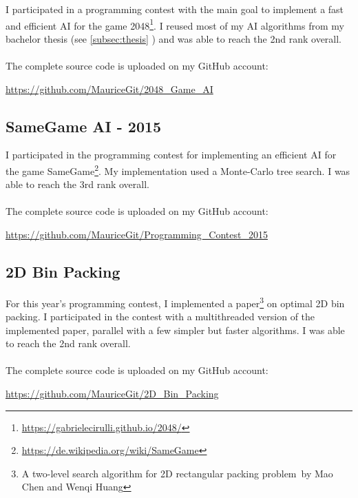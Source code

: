 \documentclass[a4paper, 12pt]{article}
\begin{document}
I participated in a programming contest with the main goal to implement a fast and efficient AI for the game
2048\footnote{\url{https://gabrielecirulli.github.io/2048/}}. I reused most of my AI algorithms from my bachelor 
thesis (see \ref{subsec:thesis} \glqq{}\grqq) and was able to reach the 2nd rank overall.
\\
\\
The complete source code is uploaded on my GitHub account:

\begin{center}
	\url{https://github.com/MauriceGit/2048_Game_AI}
\end{center}

\subsection{SameGame AI - 2015}

I participated in the programming contest for implementing an efficient AI for the game
SameGame\footnote{\url{https://de.wikipedia.org/wiki/SameGame}}. My implementation used a Monte-Carlo tree 
search. I was able to reach the 3rd rank overall.
\\
\\
The complete source code is uploaded on my GitHub account:

\begin{center}
	\url{https://github.com/MauriceGit/Programming_Contest_2015}
\end{center}


\subsection{2D Bin Packing}

For this year's programming contest, I implemented a paper\footnote{\glqq A two-level search algorithm for 2D rectangular	packing problem\grqq \ by Mao Chen and Wenqi Huang} on optimal 2D bin packing.
\newline
I participated in the contest with a multithreaded version of the implemented paper, parallel with a few simpler but faster algorithms. I was able to reach the 2nd rank overall.
\\
\\
The complete source code is uploaded on my GitHub account:

\begin{center}
	\url{https://github.com/MauriceGit/2D_Bin_Packing}
\end{center}
\end{document}
